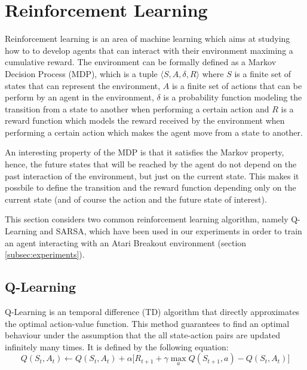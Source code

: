 \section{Reinforcement Learning}
Reinforcement learning \cite{Suttonrl18} is an area of machine learning
which aims at studying how to to develop agents that can interact with
their environment maximing a cumulative reward. The environment can be
formally defined as a Markov Decision Process (MDP), which is a tuple
$\langle S, A, \delta, R \rangle$ where $S$ is a finite set of states that can represent
the environment, $A$ is a finite set of actions that can be perform by
an agent in the environment, $\delta$ is a probability function modeling
the transition from a state to another when performing a certain action and
$R$ is a reward function which models the reward received by the environment
when performing a certain action which makes the agent move from a state
to another.

An interesting property of the MDP is that it satisfies the Markov property,
hence, the future states that will be reached by the agent do not depend
on the past interaction of the environment, but just on the current state.
This makes it possbile to define the transition and the reward function
depending only on the current state (and of course the action and the future
state of interest).

This section considers two common reinforcement learning algorithm,
namely Q-Learning and SARSA, which have been used in our experiments
in order to train an agent interacting with an Atari Breakout environment
(section \ref{subsec:experiments}).

\subsection{Q-Learning}
Q-Learning is an temporal difference (TD) algorithm that directly approximates
the optimal action-value
function. This method guarantees to find an optimal behaviour under the
assumption that the all state-action pairs are updated infinitely many times. It is
defined \cite{Suttonrl18} by the following equation:
\begin{equation}
    \label{eq:qlearning-update-function}
    Q(S_t, A_t) \leftarrow Q(S_t, A_t) + \alpha \Big[ R_{t+1} +
        \gamma \max_{a} Q(S_{t+1}, a) - Q(S_t, A_t) \Big]
\end{equation}

